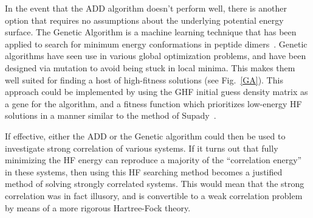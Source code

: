 \documentclass{revtex4}
\begin{document}
    In the event that the ADD algorithm doesn't perform well, there is another option that requires 
    no assumptions about the underlying potential energy surface. The Genetic Algorithm is a 
    machine learning technique that has been applied to search for minimum energy conformations in 
    peptide dimers~\cite{Supady2015}. Genetic algorithms have seen use in various global 
    optimization problems, and have been designed via mutation to avoid being stuck in local 
    minima. This makes them well suited for finding a host of high-fitness solutions (see 
    Fig.~\ref{GA}). This approach could be implemented by using the GHF initial guess density 
    matrix as a gene 
    for the algorithm, and a fitness function which prioritizes low-energy HF solutions in a manner 
    similar to the method of Supady~\cite{Supady2015}. 
    
    If effective, either the ADD or the Genetic   algorithm could then be used to investigate 
    strong 
    correlation of various systems. If it 
    turns out that fully minimizing the HF energy can reproduce a majority of the ``correlation 
    energy'' in these systems, then using this HF searching method becomes a justified method of 
    solving strongly correlated systems. This would mean that the strong correlation was in fact illusory, and is convertible to a weak correlation problem by means of a more rigorous Hartree-Fock theory. 
    
\end{document}
